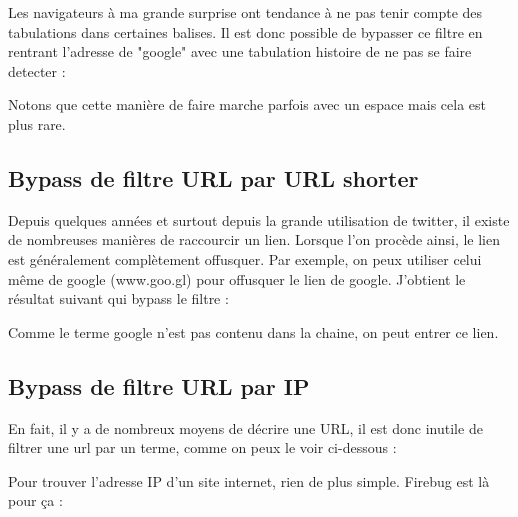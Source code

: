 \documentclass{article}
\begin{document}
Les navigateurs à ma grande surprise ont tendance à ne pas tenir compte des tabulations dans certaines balises. Il est donc possible de bypasser ce filtre en rentrant l'adresse de "google" avec une tabulation histoire de ne pas se faire detecter :
\vspace{0.2cm}\\
\vspace{0.2cm}

Notons que cette manière de faire marche parfois avec un espace mais cela est plus rare. 

\subsection{Bypass de filtre URL par URL shorter}

Depuis quelques années et surtout depuis la grande utilisation de twitter, il existe de nombreuses manières de raccourcir un lien. Lorsque l'on procède ainsi, le lien est généralement complètement offusquer. Par exemple, on peux utiliser celui même de google (www.goo.gl) pour offusquer le lien de google. J'obtient le résultat suivant qui bypass le filtre :
\vspace{0.2cm}\\
\vspace{0.2cm}

Comme le terme google n'est pas contenu dans la chaine, on peut entrer ce lien.

\subsection{Bypass de filtre URL par IP}

En fait, il y a de nombreux moyens de décrire une URL, il est donc inutile de filtrer une url par un terme, comme on peux le voir ci-dessous :
\vspace{0.2cm}\\
\vspace{0.2cm}

Pour trouver l'adresse IP d'un site internet, rien de plus simple. Firebug est là pour ça :
\vspace{0.2cm}\\
\vspace{0.2cm}
\end{document}
